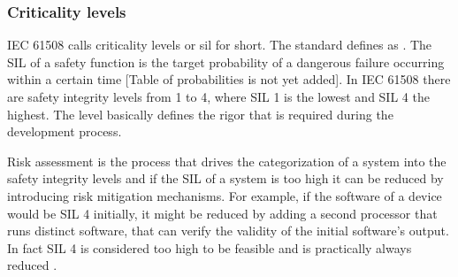 \subsubsection{Criticality levels}
IEC 61508 calls criticality levels  or  \acrshort{sil} for short. The standard defines  as \cite{IEC.2010-1}. The SIL of a safety function is the target probability of a dangerous failure occurring within a certain time [Table of probabilities is not yet added]. In IEC 61508 there are safety integrity levels from 1 to 4, where SIL 1 is the lowest and SIL 4 the highest. The level basically defines the rigor that is required during the development process.

Risk assessment is the process that drives the categorization of a system into the safety integrity levels and if the SIL of a system is too high it can be reduced by introducing risk mitigation mechanisms. For example, if the software of a device would be SIL 4 initially, it might be reduced by adding a second processor that runs distinct software, that can verify the validity of the initial software's output.  In fact SIL 4 is considered too high to be feasible and is practically always reduced \cite{MTLInstrumentsGroup.March2002}.



